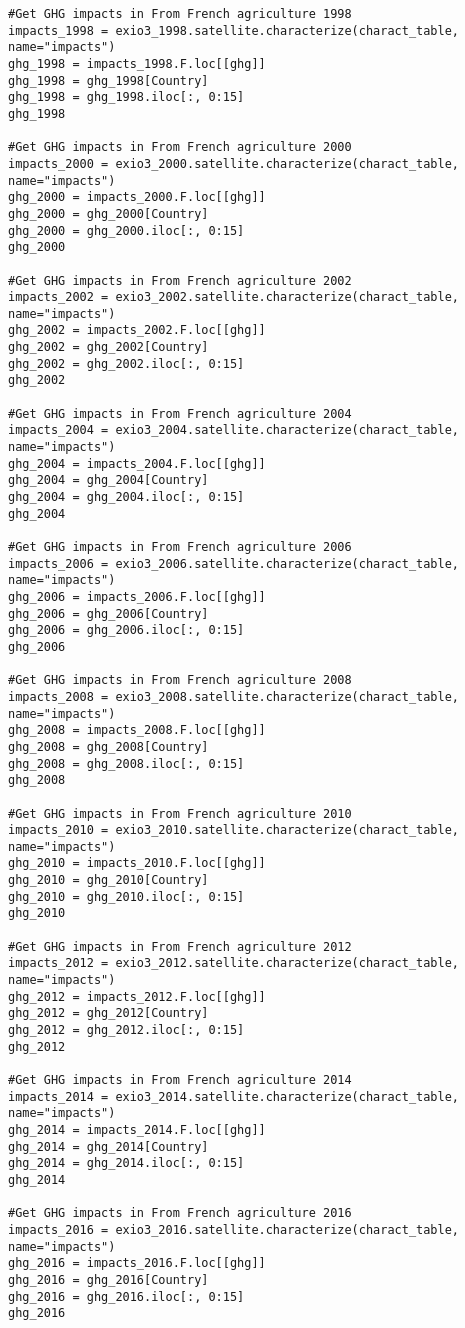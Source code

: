 \documentclass[a4paper,twoside]{article}
\begin{document}
\begin{verbatim}
#Get GHG impacts in From French agriculture 1998
impacts_1998 = exio3_1998.satellite.characterize(charact_table, name="impacts")
ghg_1998 = impacts_1998.F.loc[[ghg]]
ghg_1998 = ghg_1998[Country]
ghg_1998 = ghg_1998.iloc[:, 0:15]
ghg_1998

#Get GHG impacts in From French agriculture 2000
impacts_2000 = exio3_2000.satellite.characterize(charact_table, name="impacts")
ghg_2000 = impacts_2000.F.loc[[ghg]]
ghg_2000 = ghg_2000[Country]
ghg_2000 = ghg_2000.iloc[:, 0:15]
ghg_2000

#Get GHG impacts in From French agriculture 2002
impacts_2002 = exio3_2002.satellite.characterize(charact_table, name="impacts")
ghg_2002 = impacts_2002.F.loc[[ghg]]
ghg_2002 = ghg_2002[Country]
ghg_2002 = ghg_2002.iloc[:, 0:15]
ghg_2002

#Get GHG impacts in From French agriculture 2004
impacts_2004 = exio3_2004.satellite.characterize(charact_table, name="impacts")
ghg_2004 = impacts_2004.F.loc[[ghg]]
ghg_2004 = ghg_2004[Country]
ghg_2004 = ghg_2004.iloc[:, 0:15]
ghg_2004

#Get GHG impacts in From French agriculture 2006
impacts_2006 = exio3_2006.satellite.characterize(charact_table, name="impacts")
ghg_2006 = impacts_2006.F.loc[[ghg]]
ghg_2006 = ghg_2006[Country]
ghg_2006 = ghg_2006.iloc[:, 0:15]
ghg_2006

#Get GHG impacts in From French agriculture 2008
impacts_2008 = exio3_2008.satellite.characterize(charact_table, name="impacts")
ghg_2008 = impacts_2008.F.loc[[ghg]]
ghg_2008 = ghg_2008[Country]
ghg_2008 = ghg_2008.iloc[:, 0:15]
ghg_2008

#Get GHG impacts in From French agriculture 2010
impacts_2010 = exio3_2010.satellite.characterize(charact_table, name="impacts")
ghg_2010 = impacts_2010.F.loc[[ghg]]
ghg_2010 = ghg_2010[Country]
ghg_2010 = ghg_2010.iloc[:, 0:15]
ghg_2010

#Get GHG impacts in From French agriculture 2012
impacts_2012 = exio3_2012.satellite.characterize(charact_table, name="impacts")
ghg_2012 = impacts_2012.F.loc[[ghg]]
ghg_2012 = ghg_2012[Country]
ghg_2012 = ghg_2012.iloc[:, 0:15]
ghg_2012

#Get GHG impacts in From French agriculture 2014
impacts_2014 = exio3_2014.satellite.characterize(charact_table, name="impacts")
ghg_2014 = impacts_2014.F.loc[[ghg]]
ghg_2014 = ghg_2014[Country]
ghg_2014 = ghg_2014.iloc[:, 0:15]
ghg_2014

#Get GHG impacts in From French agriculture 2016
impacts_2016 = exio3_2016.satellite.characterize(charact_table, name="impacts")
ghg_2016 = impacts_2016.F.loc[[ghg]]
ghg_2016 = ghg_2016[Country]
ghg_2016 = ghg_2016.iloc[:, 0:15]
ghg_2016


\end{verbatim}
\end{document}

